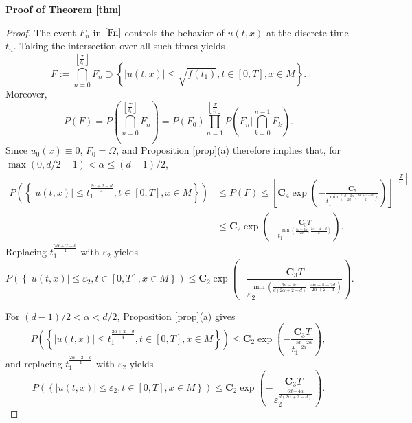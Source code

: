\documentclass[12pt]{amsart}
\numberwithin{equation}{section}
\newcommand{\1}{\mathbf{1}}
\begin{document}
\textbf{Proof of Theorem \ref{thm}}
\begin{proof}
The event $F_{n}$ in $\eqref{Fn}$ controls the behavior of $u(t,x)$ at the discrete time $t_n$. Taking the intersection over all such times yields
\[F:=\bigcap_{n=0}^{\left\lfloor\frac{T}{t_1}\right\rfloor}F_{n}\supset \left\lbrace\vert u(t,x)\vert\leq \sqrt{f(t_1)}, t\in[0,T],x\in M\right\rbrace.\]
Moreover,
\[P(F)=P\left(\bigcap_{n=0}^{\left\lfloor\frac{T}{t_1}\right\rfloor}F_{n}\right)=P(F_{0})\prod_{n=1}^{\left\lfloor\frac{T}{t_1}\right\rfloor}P\left(F_{n}\bigg| \bigcap_{k=0}^{n-1}F_{k}\right).\]
Since $u_0(x)\equiv 0$, $F_0=\Omega$, and Proposition \ref{prop}(a) therefore implies that, for $\max(0,d/2-1)<\alpha\leq(d-1)/2$,
\begin{align*}
P\left(\left\lbrace\vert u(t,x)\vert\leq t_1^\frac{2\alpha+2-d}{4}, t\in[0,T],x\in M\right\rbrace\right)&\leq P(F)\leq \left[\textbf{C}_4\exp\left(-\frac{\textbf{C}_5}{t_1^{\min\left(\frac{d-2\alpha}{2d},\frac{2\alpha+2-d}{2}\right)}}\right)\right]^{\left\lfloor\frac{T}{t_1}\right\rfloor}\\
&\leq \textbf{C}_2\exp\left(-\frac{\textbf{C}_3T}{t_1^{\min\left(\frac{3d-2\alpha}{2d},\frac{2\alpha+4-d}{2}\right)}}\right).
\end{align*}
Replacing $t_1^\frac{2\alpha+2-d}{4}$ with $\varepsilon_2$ yields
\begin{equation*}
P\left(\left\lbrace\vert u(t,x)\vert\leq \varepsilon_2, t\in[0,T],x\in M\right\rbrace\right)\leq\textbf{C}_2\exp\left(-\frac{\textbf{C}_3T}{\varepsilon_2^{\min\left(\frac{6d-4\alpha}{d(2\alpha+2-d)},\frac{4\alpha+8-2d}{2\alpha+2-d}\right)}}\right).
\end{equation*}

For $(d-1)/2<\alpha< d/2$, Proposition \ref{prop}(a) gives
\[
P\left(\left\lbrace\vert u(t,x)\vert\leq t_1^\frac{2\alpha+2-d}{4}, t\in[0,T],x\in M\right\rbrace\right)\leq\textbf{C}_2\exp\left(-\frac{\textbf{C}_3T}{t_1^{\frac{3d-2\alpha}{2d}}}\right),
\]
and replacing $t_1^\frac{2\alpha+2-d}{4}$ with $\varepsilon_2$ yields
\begin{equation*}
P\left(\left\lbrace\vert u(t,x)\vert\leq \varepsilon_2, t\in[0,T],x\in M\right\rbrace\right)\leq\textbf{C}_2\exp\left(-\frac{\textbf{C}_3T}{\varepsilon_2^{\frac{6d-4\alpha}{d(2\alpha+2-d)}}}\right).
\end{equation*}


\end{proof}
\end{document}
